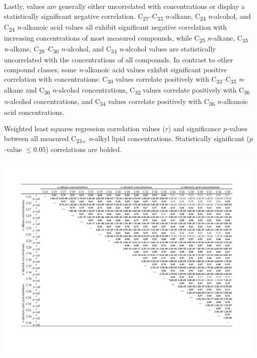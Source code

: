 Lastly,  values are generally either uncorrelated with concentrations or display a statistically significant negative correlation. C\textsubscript{27}--C\textsubscript{33} \textit{n}-alkane, C\textsubscript{24} \textit{n}-alcohol, and C\textsubscript{24} \textit{n}-alkanoic acid  values all exhibit significant negative correlation with increasing concentrations of most measured compounds, while C\textsubscript{25} \textit{n}-alkane, C\textsubscript{35} \textit{n}-alkane, C\textsubscript{28}--C\textsubscript{30} \textit{n}-alcohol, and C\textsubscript{34} \textit{n}-alcohol  values are statistically uncorrelated with the concentrations of all compounds. In contrast to other compound classes, some \textit{n}-alkanoic acid  values exhibit significant positive correlation with concentrations: C\textsubscript{30}  values correlate positively with C\textsubscript{33}--C\textsubscript{35} \textit{n}-alkane and C\textsubscript{36} \textit{n}-alcohol concentrations, C\textsubscript{32}  values correlate positively with C\textsubscript{36} \textit{n}-alcohol concentrations, and C\textsubscript{34}  values correlate positively with C\textsubscript{36} \textit{n}-alkanoic acid concentrations. 

\begin{table}
	\caption[C\textsubscript{23+} concentration correlation $r$ and $p$-values]{Weighted least squares regression correlation values ($r$) and significance $p$-values between all measured C\textsubscript{23+} \textit{n}-alkyl lipid concentrations. Statistically significant ($p$-value $\leq  0.05$) correlations are bolded.}
	\centering
		\includegraphics{Thesis_Tables/Ch4Tab1}
	\label{Ch4Tab:1} 
\end{table}

